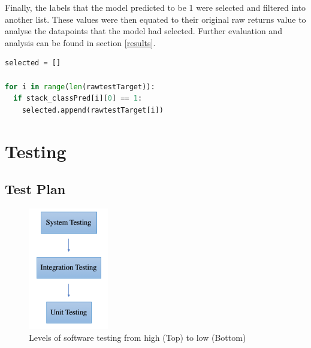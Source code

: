 \documentclass[10pt,onecolumn,letterpaper]{article}
\begin{document}
Finally, the labels that the model predicted to be 1 were selected and filtered into another list. These values were then equated to their original raw returns value to analyse the datapoints that the model had selected. Further evaluation and analysis can be found in section \ref{results}.

\begin{lstlisting}[language=Python, breaklines=true, caption={Filtering out positively labelled predictions to extract related actual return.}]
selected = []

for i in range(len(rawtestTarget)):
  if stack_classPred[i][0] == 1: 
    selected.append(rawtestTarget[i])
\end{lstlisting} 



\newpage

\section{Testing}

\subsection{Test Plan} 

\begin{figure}[!hbt!]
\centering
\includegraphics[width=3.5cm]{evaluation.png}
\caption{Levels of software testing from high (Top) to low (Bottom)}
\end{figure}
\end{document}
